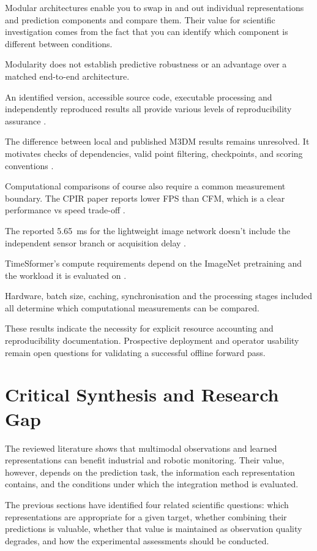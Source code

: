 Modular architectures enable you to swap in and out individual representations and prediction
components and compare them. Their value for scientific investigation comes from the fact that you
can identify which component is different between conditions.

Modularity does not establish predictive robustness or an advantage over a matched end-to-end
architecture.

An identified version, accessible source code, executable processing and independently reproduced
results all provide various levels of reproducibility assurance \parencite{pineau_improving_2021}.

The difference between local and published M3DM results remains unresolved. It motivates checks of
dependencies, valid point filtering, checkpoints, and scoring conventions \parencite{xu_cross-modal_2026}.

Computational comparisons of course also require a common measurement boundary. The CPIR paper
reports lower FPS than CFM, which is a clear performance vs speed trade-off
\parencite{shangguan_cpir_2025}.

The reported 5.65~ms for the lightweight image network doesn't include the independent sensor branch
or acquisition delay \parencite[Table~V]{zhang_combined_2024}.

TimeSformer's compute requirements depend on the ImageNet pretraining and the workload it is
evaluated on \parencite{bertasius_is_2021}.

Hardware, batch size, caching, synchronisation and the processing stages included all determine
which computational measurements can be compared.

These results indicate the necessity for explicit resource accounting and reproducibility
documentation. Prospective deployment and operator usability remain open questions for validating a
successful offline forward pass.

\section{Critical Synthesis and Research Gap}

The reviewed literature shows that multimodal observations and learned representations can benefit
industrial and robotic monitoring. Their value, however, depends on the prediction task, the
information each representation contains, and the conditions under which the integration method is
evaluated.

The previous sections have identified four related scientific questions: which representations are
appropriate for a given target, whether combining their predictions is valuable, whether that value
is maintained as observation quality degrades, and how the experimental assessments should be
conducted.

